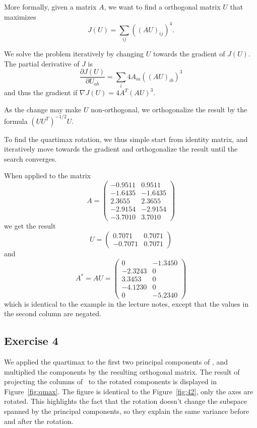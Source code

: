 \documentclass{article}
\begin{document}
More formally, given a matrix $A$, we want to find a orthogonal matrix $U$ that maximizes
$$ J(U) = \sum_{ij}((AU)_{ij})^4. $$

We solve the problem iteratively by changing $U$ towards the gradient of $J(U)$. The partial derivative of $J$ is
$$ \frac{\partial J(U)}{\partial U_{ab}} = \sum_i4A_{ia}((AU)_{ib})^3$$
and thus the gradient if $\nabla J(U)=4A^T(AU)^3$.

As the change may make $U$ non-orthogonal, we orthogonalize the result by the formula $(UU^T)^{-1/2}U$.

To find the quartimax rotation, we thus simple start from identity matrix, and iteratively move towards the gradient and orthogonalize the result until the search converges.

When applied to the matrix
$$ A =
\begin{pmatrix}
	-0.9511 & 0.9511 \\
	-1.6435 & -1.6435 \\
	 2.3655 & 2.3655 \\
	-2.9154 & -2.9154 \\
	-3.7010 & 3.7010
\end{pmatrix}$$
we get the result
$$ U =
\begin{pmatrix}
	0.7071 & 0.7071\\
   -0.7071 & 0.7071
\end{pmatrix} $$
and
$$ A^* = AU =
\begin{pmatrix}
	0 & -1.3450 \\
	-2.3243 & 0\\
	 3.3453 & 0\\
	-4.1230 & 0\\
		  0 & -5.2340
\end{pmatrix} $$
which is identical to the example in the lecture notes, except that the values in the second column are negated.

\subsection{Exercise 4}
We applied the quartimax to the first two principal components of \X, and multiplied the components by the resulting orthogonal matrix. The result of projecting the columns of \X\ to the rotated components is displayed in Figure~\ref{fig:qmax}.
The figure is identical to the Figure~\ref{fig:42}, only the axes are rotated.
This highlights the fact that the rotation doesn't change the subspace spanned by the principal components, so they explain the same variance before and after the rotation.
\end{document}
